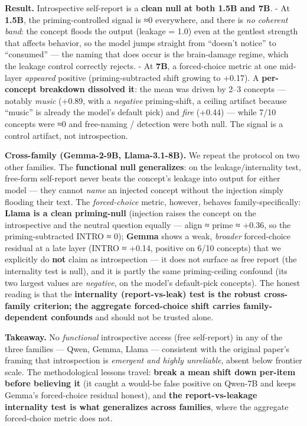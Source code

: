 \documentclass[
]{article}
\begin{document}
\textbf{Result.} Introspective self-report is a \textbf{clean null at
both 1.5B and 7B}. - At \textbf{1.5B}, the priming-controlled signal is
≈0 everywhere, and there is \emph{no coherent band}: the concept floods
the output (leakage = 1.0) even at the gentlest strength that affects
behavior, so the model jumps straight from ``doesn't notice'' to
``consumed'' --- the naming that does occur is the brain-damage regime,
which the leakage control correctly rejects. - At \textbf{7B}, a
forced-choice metric at one mid-layer \emph{appeared} positive
(priming-subtracted shift growing to +0.17). A \textbf{per-concept
breakdown dissolved it}: the mean was driven by 2--3 concepts ---
notably \emph{music} (+0.89, with a \emph{negative} priming-shift, a
ceiling artifact because ``music'' is already the model's default pick)
and \emph{fire} (+0.44) --- while 7/10 concepts were ≈0 and free-naming
/ detection were both null. The signal is a control artifact, not
introspection.

\textbf{Cross-family (Gemma-2-9B, Llama-3.1-8B).} We repeat the protocol
on two other families. The \textbf{functional null generalizes}: on the
leakage/internality test, free-form self-report never beats the
concept's leakage into output for either model --- they cannot
\emph{name} an injected concept without the injection simply flooding
their text. The \emph{forced-choice} metric, however, behaves
family-specifically: \textbf{Llama is a clean priming-null} (injection
raises the concept on the introspective and the neutral question equally
--- align ≈ prime ≈ +0.36, so the priming-subtracted INTRO ≈ 0);
\textbf{Gemma} shows a weak, \emph{broader} forced-choice residual at a
late layer (INTRO ≈ +0.14, positive on 6/10 concepts) that we explicitly
do \textbf{not} claim as introspection --- it does not surface as free
report (the internality test is null), and it is partly the same
priming-ceiling confound (its two largest values are \emph{negative}, on
the model's default-pick concepts). The honest reading is that the
\textbf{internality (report-vs-leak) test is the robust cross-family
criterion; the aggregate forced-choice shift carries family-dependent
confounds} and should not be trusted alone.

\textbf{Takeaway.} No \emph{functional} introspective access (free
self-report) in any of the three families --- Qwen, Gemma, Llama ---
consistent with the original paper's framing that introspection is
\emph{emergent and highly unreliable}, absent below frontier scale. The
methodological lessons travel: \textbf{break a mean shift down per-item
before believing it} (it caught a would-be false positive on Qwen-7B and
keeps Gemma's forced-choice residual honest), and \textbf{the
report-vs-leakage internality test is what generalizes across families},
where the aggregate forced-choice metric does not.
\end{document}

